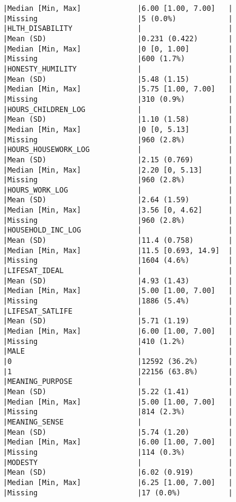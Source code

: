 \documentclass[
  singlecolumn]{report}
\begin{document}
\begin{verbatim}
|Median [Min, Max]             |6.00 [1.00, 7.00]   |
|Missing                       |5 (0.0%)            |
|HLTH_DISABILITY               |                    |
|Mean (SD)                     |0.231 (0.422)       |
|Median [Min, Max]             |0 [0, 1.00]         |
|Missing                       |600 (1.7%)          |
|HONESTY_HUMILITY              |                    |
|Mean (SD)                     |5.48 (1.15)         |
|Median [Min, Max]             |5.75 [1.00, 7.00]   |
|Missing                       |310 (0.9%)          |
|HOURS_CHILDREN_LOG            |                    |
|Mean (SD)                     |1.10 (1.58)         |
|Median [Min, Max]             |0 [0, 5.13]         |
|Missing                       |960 (2.8%)          |
|HOURS_HOUSEWORK_LOG           |                    |
|Mean (SD)                     |2.15 (0.769)        |
|Median [Min, Max]             |2.20 [0, 5.13]      |
|Missing                       |960 (2.8%)          |
|HOURS_WORK_LOG                |                    |
|Mean (SD)                     |2.64 (1.59)         |
|Median [Min, Max]             |3.56 [0, 4.62]      |
|Missing                       |960 (2.8%)          |
|HOUSEHOLD_INC_LOG             |                    |
|Mean (SD)                     |11.4 (0.758)        |
|Median [Min, Max]             |11.5 [0.693, 14.9]  |
|Missing                       |1604 (4.6%)         |
|LIFESAT_IDEAL                 |                    |
|Mean (SD)                     |4.93 (1.43)         |
|Median [Min, Max]             |5.00 [1.00, 7.00]   |
|Missing                       |1886 (5.4%)         |
|LIFESAT_SATLIFE               |                    |
|Mean (SD)                     |5.71 (1.19)         |
|Median [Min, Max]             |6.00 [1.00, 7.00]   |
|Missing                       |410 (1.2%)          |
|MALE                          |                    |
|0                             |12592 (36.2%)       |
|1                             |22156 (63.8%)       |
|MEANING_PURPOSE               |                    |
|Mean (SD)                     |5.22 (1.41)         |
|Median [Min, Max]             |5.00 [1.00, 7.00]   |
|Missing                       |814 (2.3%)          |
|MEANING_SENSE                 |                    |
|Mean (SD)                     |5.74 (1.20)         |
|Median [Min, Max]             |6.00 [1.00, 7.00]   |
|Missing                       |114 (0.3%)          |
|MODESTY                       |                    |
|Mean (SD)                     |6.02 (0.919)        |
|Median [Min, Max]             |6.25 [1.00, 7.00]   |
|Missing                       |17 (0.0%)           |

\end{verbatim}
\end{document}
